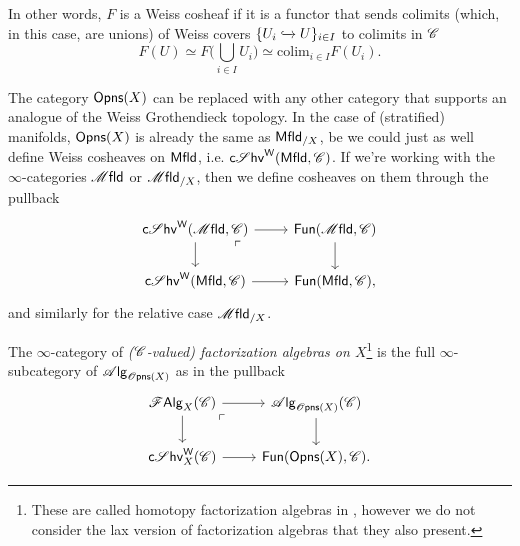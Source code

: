 \documentclass[../text]{subfiles}
\begin{document}
\begin{remark}
    In other words, $F$ is a Weiss cosheaf if it is a functor that sends colimits (which, in this case, are unions) of Weiss covers $\{ U_i \xhookrightarrow{} U \}_{i \in I}$ to colimits in $\mathscr{C}$
    \begin{equation}
        F(U) \simeq F \bigg( \bigcup_{i \in I} U_i \bigg) \simeq \mathrm{colim}_{i \in I} F(U_i).
    \end{equation}
\end{remark}

\begin{remark}
    The category $\opens[r](X)$ can be replaced with any other category that supports an analogue of the Weiss Grothendieck topology. In the case of (stratified) manifolds, $\opens[r](X)$ is already the same as $\mfld[r]_{/X}$, be we could just as well define Weiss cosheaves on $\mfld[r]$, i.e. $\csheaves[W](\mfld[r], \catC)$. If we're working with the $\infty$-categories $\mfld$ or $\mfld_{/X}$, then we define cosheaves on them through the pullback
    \begin{equation}
        \begin{tikzcd}
            \csheaves[W] (\mfld, \catC) \arrow[dr, phantom, "\ulcorner", very near start] \arrow[r] \arrow[d] & \mathsf{Fun}(\mfld, \catC) \arrow[d] \\
            \csheaves[W] (\mfld[r], \catC) \arrow[r] & \mathsf{Fun}(\mfld[r], \catC),
        \end{tikzcd}
    \end{equation}
    and similarly for the relative case $\mfld_{/X}$.
\end{remark}

\begin{definition}
    The $\infty$-category of \emph{($\mathscr{C}$-valued) factorization algebras on $X$}\footnote{These are called homotopy factorization algebras in \cite{cg2016}, however we do not consider the lax version of factorization algebras that they also present.} is the full $\infty$-subcategory of $\alg{\opens[s](X)}$ as in the pullback
    \begin{equation}
        \begin{tikzcd}
            \falg_X (\catC) \arrow[dr, phantom, "\ulcorner", very near start] \arrow[r] \arrow[d] & \alg{\opens[s](X)}(\catC) \arrow[d] \\
            \csheaves[W]_X(\catC) \arrow[r] & \mathsf{Fun}(\opens[r](X), \catC).
        \end{tikzcd}
    \end{equation}
\end{definition}
\end{document}
